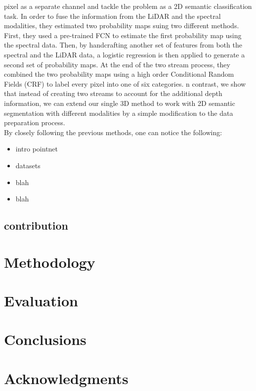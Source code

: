 \documentclass[final,3p,times,twocolumn,authoryear]{elsarticle}
\newcommand{\mxy}[1]{ \color{red}{#1}}
\begin{document}
pixel as a separate channel and tackle the problem as a 2D semantic classification task. In order to fuse the information from the LiDAR and the spectral modalities, they estimated two probability maps suing two different methods. First, they used a pre-trained FCN to estimate the first probability map using the spectral data. Then, by handcrafting another set of features from both the spectral and the LiDAR data, a logistic regression is then applied to generate a second set of probability maps. At the end of the two stream process, they combined the two probability maps using a high order Conditional Random Fields (CRF) to label every pixel into one of six categories. {\mxy In contrast, we show that instead of creating two streams to account for the additional depth information, we can extend our single 3D method to work with 2D semantic segmentation with different modalities by a simple modification to the data preparation process}.
\\By closely following the previous methods, one can notice the following: \begin{itemize}
\item intro pointnet
\item datasets
\item blah
\item blah

\end{itemize}

\subsection{contribution}


\section{Methodology}
\label{}

\section{Evaluation}
\label{}

\section{Conclusions}
\label{}

\section*{Acknowledgments}
\end{document}
